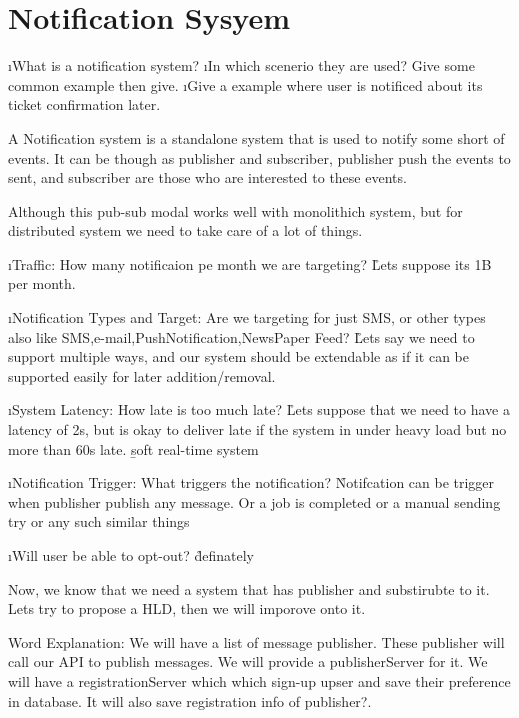 \chapter{Notification Sysyem}

\ls
    \i What is a notification system?
    \i In which scenerio they are used? Give some common example then give.
    \i Give a example where user is notificed about its ticket confirmation later.
\le

A Notification system is a standalone system that is used to notify some short of events. It can be though as publisher and subscriber, publisher push the events to sent, and subscriber are those who are interested to these events.

Although this pub-sub modal works well with monolithich system, but for distributed system we need to take care of a lot of things.


\ls

    \i Traffic: How many notificaion pe month we are targeting?
    \r{Lets suppose its 1B per month.}

    \i Notification Types and Target: Are we targeting for just SMS, or other types also like SMS,e-mail,PushNotification,NewsPaper Feed?
    \r{Lets say we need to support multiple ways, and our system should be extendable as if it can be supported easily for later addition/removal.}

    \i System Latency: How late is too much late?
    \r{Lets suppose that we need to have a latency of 2s, but is okay to deliver late if the system in under heavy load but no more than 60s late. \b{soft real-time system}}

    \i Notification Trigger: What triggers the notification?
    \r{Notifcation can be trigger when publisher publish any message. Or a job is completed or a manual sending try or any such similar things}

    \i Will user be able to opt-out?
    \r{definately}
\le



Now, we know that we need a system that has publisher and substirubte to it. Lets try to propose a HLD, then we will imporove onto it.

Word Explanation: 
We will have a list of message publisher. These publisher will call our API to publish messages. We will provide a publisherServer for it. We will have a registrationServer which which sign-up upser and save their preference in database. It will also save registration info of publisher?. 

